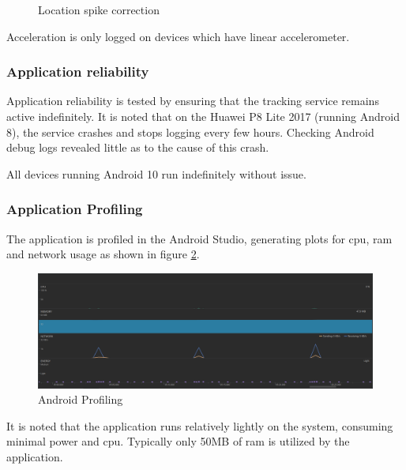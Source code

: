\begin{figure}[H]
\centering
\caption{Location spike correction}
\label{fig:spike_correction}
\end{figure}
Acceleration is only logged on devices which have linear accelerometer.

\subsubsection{Application reliability}
Application reliability is tested by ensuring that the tracking service remains active indefinitely.
It is noted that on the Huawei P8 Lite 2017 (running Android 8), the service crashes and stops logging every few hours.
Checking Android debug logs revealed little as to the cause of this crash.

All devices running Android 10 run indefinitely without issue.

\subsubsection{Application Profiling}
The application is profiled in the Android Studio, generating plots for \ac{cpu}, \ac{ram} and network usage as shown in figure \ref{fig:android_profiling}.
\begin{figure}[H]
\centering
\includegraphics[width=6in]{android_profiling.png}
\caption{Android Profiling}
\label{fig:android_profiling}
\end{figure}
It is noted that the application runs relatively lightly on the system, consuming minimal power and \ac{cpu}.
Typically only 50MB of \ac{ram} is utilized by the application.

